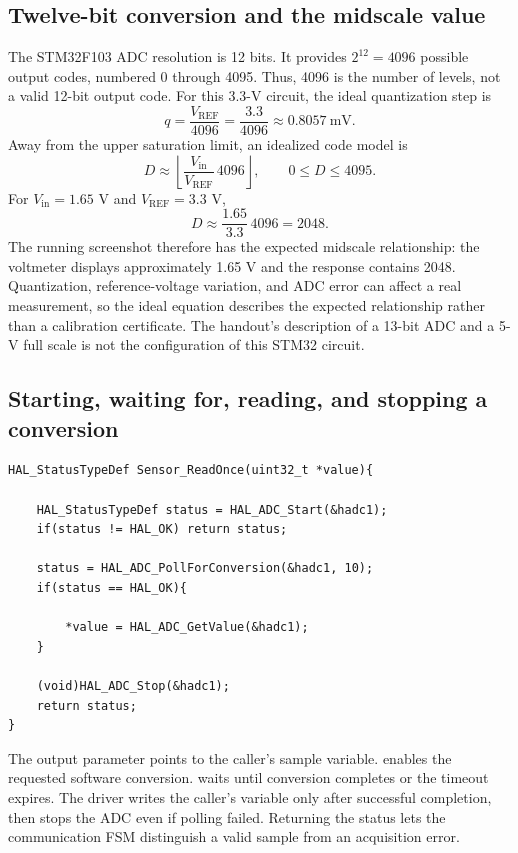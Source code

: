\documentclass[a4paper]{article}
\newcommand{\code}[1]{\texttt{\detokenize{#1}}}
\newcommand{\topic}[1]{\subsection{#1}}
\begin{document}
\topic{Twelve-bit conversion and the midscale value}

The STM32F103 ADC resolution is 12 bits\cite{stm32}. It provides
\(2^{12}=4096\) possible output codes, numbered 0 through 4095. Thus, 4096
is the number of levels, not a valid 12-bit output code. For this 3.3-V circuit,
the ideal quantization step is
\[
q=\frac{V_{\mathrm{REF}}}{4096}
=\frac{3.3}{4096}\approx0.8057\ \mathrm{mV}.
\]
Away from the upper saturation limit, an idealized code model is
\[
D\approx\left\lfloor\frac{V_{\mathrm{in}}}{V_{\mathrm{REF}}}\,4096\right\rfloor,
\qquad 0\leq D\leq4095.
\]
For \(V_{\mathrm{in}}=1.65\) V and \(V_{\mathrm{REF}}=3.3\) V,
\[
D\approx\frac{1.65}{3.3}\,4096=2048.
\]
The running screenshot therefore has the expected midscale relationship:
the voltmeter displays approximately 1.65 V and the response contains 2048.
Quantization, reference-voltage variation, and ADC error can affect a real
measurement, so the ideal equation describes the expected relationship rather
than a calibration certificate. The handout's description of a 13-bit ADC and
a 5-V full scale is not the configuration of this STM32 circuit.


\topic{Starting, waiting for, reading, and stopping a conversion}

\par\noindent\begin{minipage}{\linewidth}
\begin{lstlisting}[caption={One valid sample per accepted request},firstnumber=1]
HAL_StatusTypeDef Sensor_ReadOnce(uint32_t *value){

    HAL_StatusTypeDef status = HAL_ADC_Start(&hadc1);
    if(status != HAL_OK) return status;

    status = HAL_ADC_PollForConversion(&hadc1, 10);
    if(status == HAL_OK){

        *value = HAL_ADC_GetValue(&hadc1);
    }

    (void)HAL_ADC_Stop(&hadc1);
    return status;
}
\end{lstlisting}
\end{minipage}\par

The output parameter points to the caller's sample variable.
\code{HAL_ADC_Start} enables the requested software conversion.
\code{HAL_ADC_PollForConversion} waits until conversion completes or the timeout
expires. The driver writes the caller's variable only after successful
completion, then stops the ADC even if polling failed. Returning the status
lets the communication FSM distinguish a valid sample from an acquisition error.
\end{document}
